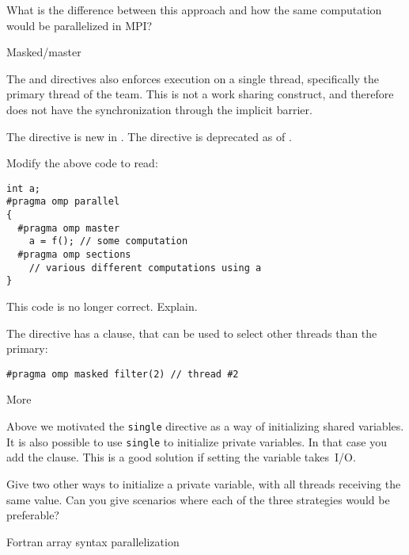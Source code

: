 \begin{exercise}
  \label{ex:omp-single-mpi}
  What is the difference between this approach and how the same
  computation would be parallelized in MPI?
\end{exercise}

 {Masked/master}

The  and  directives
also enforces execution on a single thread,
specifically the primary thread of the team.
This is not a work sharing construct, and therefore
does not have the synchronization through the implicit barrier.

\begin{remark}
  The  directive is new in .
  The  directive is deprecated
  as of .
\end{remark}

\begin{exercise}
  Modify the above code to read:
\begin{lstlisting}
int a;
#pragma omp parallel
{
  #pragma omp master
    a = f(); // some computation
  #pragma omp sections
    // various different computations using a
}
\end{lstlisting}
  This code is no longer correct. Explain.
\end{exercise}

The  directive has a  clause,
that can be used to select other threads than the primary:
\begin{lstlisting}
#pragma omp masked filter(2) // thread #2
\end{lstlisting}

 {More}

Above we motivated the \lstinline{single} directive as a way of initializing
shared variables. It is also possible to use \lstinline{single} to initialize
private variables. In that case you add the 
clause. This is a good solution if setting the variable takes~I/O.

\begin{exercise}
  Give two other ways to initialize a private variable, with all
  threads receiving the same value. Can you give scenarios where each
  of the three strategies would be preferable?
\end{exercise}

 {Fortran array syntax parallelization}
\label{sec:fortran-workshare}


